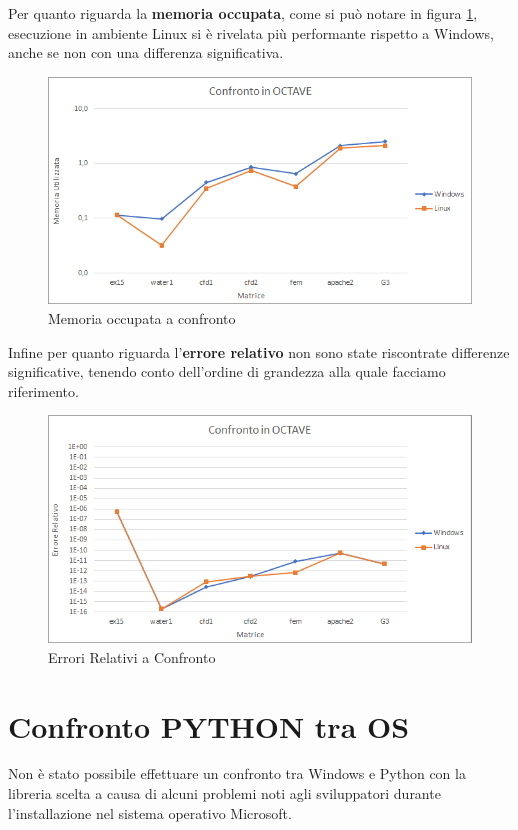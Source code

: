 \documentclass[a4paper,12pt,titlepage,oneside]{book}
\begin{document}
    \noindent Per quanto riguarda la \textbf{memoria occupata}, come si può notare in figura \ref{plot:memoct}, esecuzione in ambiente Linux si è rivelata più performante rispetto a Windows, anche se non con una differenza significativa.
    
    \begin{figure}[ht]
        \centering
        \includegraphics[scale=0.8]{src/plot/MemOCT.png}
        \caption{Memoria occupata a confronto}
        \label{plot:memoct}
    \end{figure}
    
    \noindent Infine per quanto riguarda l'\textbf{errore relativo} non sono state riscontrate differenze significative, tenendo conto dell'ordine di grandezza alla quale facciamo riferimento.
    
    \begin{figure}[ht]
        \centering
        \includegraphics[scale=0.8]{src/plot/ErrOCT.png}
        \caption{Errori Relativi a Confronto}
        \label{plot:erroct}
    \end{figure}
    
    \section{Confronto PYTHON tra OS}
    \noindent Non è stato possibile effettuare un confronto tra Windows e Python con la libreria scelta a causa di alcuni problemi noti agli sviluppatori durante l'installazione nel sistema operativo Microsoft.
\end{document}
